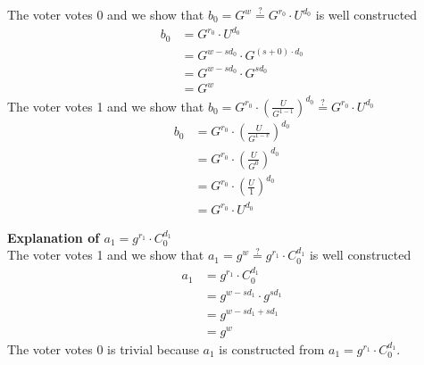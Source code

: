 \noindent
The voter votes 0 and we show that \begin{math}b_0 =  G^w  \stackrel{?}{=} G^{r_0} \cdot U^{d_0} \end{math} is well constructed
\begin{align*}
    b_0 &= G^{r_0} \cdot U^{d_0}                    \\
        &= G^{w-sd_0} \cdot G^{(s+0) \cdot d_{0}}   \\
        &= G^{w-sd_0} \cdot G^{sd_{0}}              \\
        &= G^w                                          
\end{align*}
The voter votes 1 and we show that \begin{math}b_0 = G^{r_0} \cdot (\frac{U}{G^{1-1}})^{d_0} \stackrel{?}{=}  G^{r_0} \cdot U^{d_0} \end{math}
\begin{align*}
    b_0 &= G^{r_0} \cdot (\frac{U}{G^{1-v}})^{d_0}  \\
        &= G^{r_0} \cdot (\frac{U}{G^{0}})^{d_0}    \\
        &= G^{r_0} \cdot (\frac{U}{1})^{d_0}        \\
        &= G^{r_0} \cdot U^{d_0}  
\end{align*}



\noindent
\textbf{Explanation of \begin{math}a_1=g^{r_1}  \cdot  C^{d_1}_0\end{math}}\\

\noindent
The voter votes 1 and we show that \begin{math}a_1=g^w \stackrel{?}{=} g^{r_1}  \cdot  C^{d_1}_0 \end{math} is well constructed
\begin{align*}
    a_1 &= g^{r_1}  \cdot  C^{d_1}_0    \\
        &= g^{w-sd_1} \cdot  g^{sd_1}   \\
        &= g^{w-sd_1+ sd_1}             \\
        &= g^w
\end{align*}
The voter votes 0 is trivial because \begin{math}a_1 \end{math} is constructed from \begin{math}a_1=g^{r_1}  \cdot  C^{d_1}_0 \end{math}.\\


